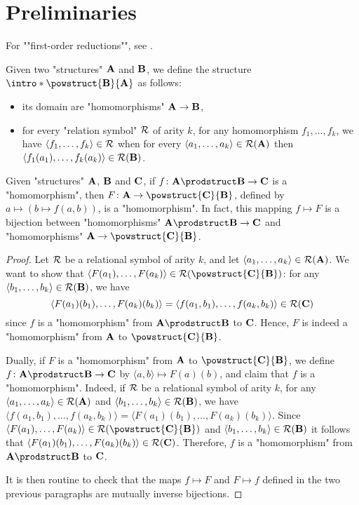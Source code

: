 \section{Preliminaries}

For \AP""first-order reductions"", see
\cite[Definition 2.11 \& Definition 1.26]{Immerman1998DescriptiveComplexity}.

Given two "structures" $\mathbf{A}$ and $\mathbf{B}$, we define the structure \AP$\intro*\powstruct{\?B}{\?A}$ as follows:
\begin{itemize}
  \item its domain are "homomorphisms" $\mathbf{A} \to \mathbf{B}$,
  \item for every "relation symbol" $\mathcal{R}$ of arity $k$, for any homomorphism $f_1,\hdots,f_k$,
  we have $\langle f_1,\hdots,f_k\rangle \in \mathcal{R}$ when for every
  $\langle a_1,\hdots,a_k\rangle \in \mathcal{R}(\mathbf{A})$
  then $\langle f_1(a_1), \hdots, f_k(a_k) \rangle \in \mathcal{R}(\mathbf{B})$.
\end{itemize}

\begin{proposition}[Folklore]
	Given "structures" $\mathbf{A}$, $\mathbf{B}$ and $\mathbf{C}$, if $f\colon \?A\prodstruct \?B \to \?C$
	is a "homomorphism", then $F\colon \?A \to \powstruct{\?C}{\?B}$,
	defined by $a \mapsto (b \mapsto f(a,b))$, is a "homomorphism".
	In fact, this mapping $f \mapsto F$ is a bijection
	between "homomorphisms" $\?A\prodstruct \?B \to \?C$
	and "homomorphisms" $\?A \to \powstruct{\?C}{\?B}$.
  \end{proposition}
  
  \begin{proof}
	Let $\mathcal{R}$ be a relational symbol of arity $k$, and let
	$\langle a_1,\hdots,a_k \rangle \in \mathcal{R}(\mathbf{A})$.
	We want to show that $\langle F(a_1),\hdots,F(a_k) \rangle \in \+R(\powstruct{\?C}{\?B})$:
	for any $\langle b_1,\hdots,b_k \rangle \in \mathcal{R}(\mathbf{B})$, we have
	\[\langle F(a_1)(b_1), \hdots, F(a_k)(b_k)\rangle = \langle f(a_1,b_1),\hdots,f(a_k,b_k) \rangle \in \mathcal{R}(\mathbf{C})\] since $f$ is a "homomorphism" from $\?A\prodstruct \?B$ to $\mathbf{C}$.
	Hence, $F$ is indeed a "homomorphism" from $\mathbf{A}$ to $\powstruct{\?C}{\?B}$.
  
	Dually, if $F$ is a "homomorphism" from $\mathbf{A}$ to $\powstruct{\?C}{\?B}$,
	we define $f\colon \?A\prodstruct \?B \to \?C$ by $\langle a,b \rangle \mapsto F(a)(b)$,
	and claim that $f$ is a "homomorphism". Indeed, if $\mathcal{R}$ be a relational symbol of arity $k$,
	for any $\langle a_1, \hdots, a_k \rangle \in \mathcal{R}(\mathbf{A})$
	and $\langle b_1, \hdots, b_k \rangle \in \mathcal{R}(\mathbf{B})$,
	we have $\langle f(a_1,b_1), \hdots, f(a_k,b_k) \rangle
	= \langle F(a_1)(b_1), \hdots, F(a_k)(b_k) \rangle$.
	Since $\langle F(a_1), \hdots, F(a_k) \rangle \in \+R(\powstruct{\?C}{\?B})$
	and $\langle b_1, \hdots,b_k \rangle \in \mathcal{R}(\mathbf{B})$ 
	it follows that $\langle F(a_1)(b_1), \hdots, F(a_k)(b_k) \rangle \in \mathcal{R}(\mathbf{C})$.
	Therefore, $f$ is a "homomorphism" from $\?A \prodstruct \?B$ to $\mathbf{C}$.
  
	It is then routine to check that the maps $f \mapsto F$ and $F \mapsto f$ defined
	in the two previous paragraphs are mutually inverse bijections.
  \end{proof}